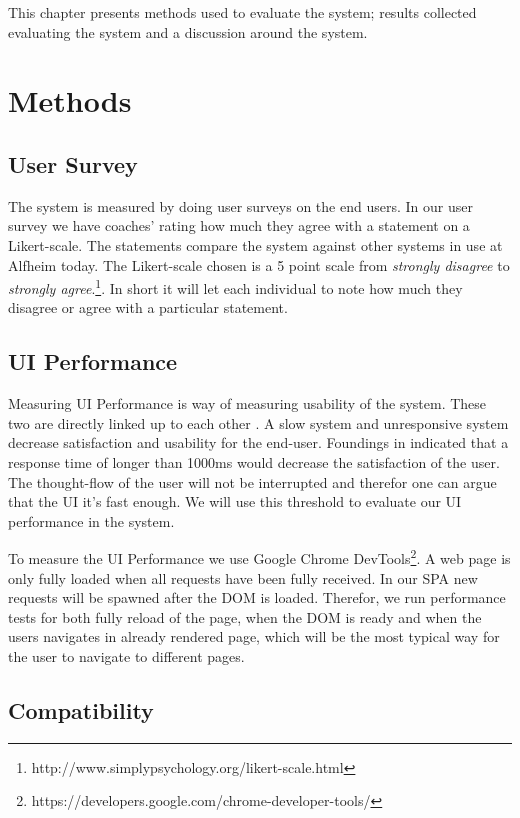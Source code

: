 This chapter presents methods used to evaluate the system; results collected evaluating the system and a discussion around the system.	

\section{Methods}
\subsection{User Survey}

The system is measured by doing user surveys on the end users. In our user survey we have coaches’ rating how much they agree with a statement on a Likert-scale. The statements compare the system against other systems in use at Alfheim today. The Likert-scale chosen is a 5 point scale from \textit{strongly disagree} to \textit{strongly agree}.\footnote{http://www.simplypsychology.org/likert-scale.html}. In short it will let each individual to note how much they disagree or agree with a particular statement.

\subsection{UI Performance}

Measuring \ac{UI} Performance is way of measuring usability of the system. These two are directly linked up to each other \cite{satisfaction}. A slow system and unresponsive system decrease satisfaction and usability for the end-user. Foundings in \cite{nielsen} indicated that a response time of longer than 1000ms would decrease the satisfaction of the user. The thought-flow of the user will not be interrupted and therefor one can argue that the \ac{UI} it's fast enough. We will use this threshold to evaluate our UI performance in the system. 

To measure the UI Performance we use Google Chrome DevTools\footnote{https://developers.google.com/chrome-developer-tools/}. A web page is only fully loaded when all requests have been fully received. In our \ac{SPA} new requests will be spawned after the \ac{DOM} is loaded. Therefor, we run performance tests for both fully reload of the page, when the DOM is ready and when the users navigates in already rendered page, which will be the most typical way for the user to navigate to different pages.

\subsection{Compatibility}


